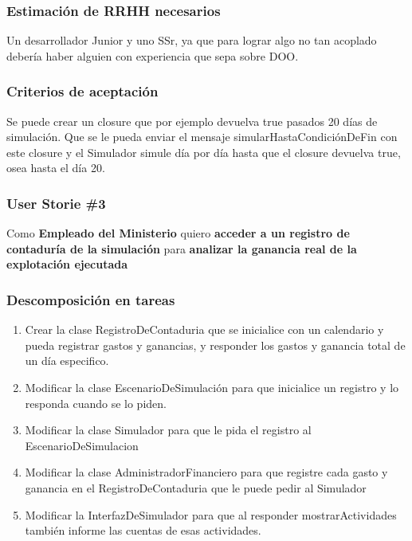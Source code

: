 \documentclass[10pt,a4paper]{article}
\begin{document}
\subsubsection*{Estimación de RRHH necesarios}

Un desarrollador Junior y uno SSr, ya que para lograr algo no tan acoplado debería haber alguien con experiencia que sepa sobre DOO.

\subsubsection*{Criterios de aceptación}

Se puede crear un closure que por ejemplo devuelva true pasados 20 días de simulación. Que se le pueda enviar el mensaje simularHastaCondiciónDeFin con este closure y el Simulador simule día por día hasta que el closure devuelva true, osea hasta el día 20.

\subsubsection{User Storie \#3}
\begin{framed}
  Como \textbf{Empleado del Ministerio} quiero \textbf{acceder a un registro de contaduría de la simulación} para \textbf{analizar la ganancia real de la explotación ejecutada}
\end{framed}

\subsubsection*{Descomposición en tareas}

\begin{enumerate}
  \item Crear la clase RegistroDeContaduria que se inicialice con un calendario y pueda registrar gastos y ganancias, y responder los gastos y ganancia total de un día especifico.
  \item Modificar la clase EscenarioDeSimulación para que inicialice un registro y lo responda cuando se lo piden.
  \item Modificar la clase Simulador para que le pida el registro al EscenarioDeSimulacion
  \item Modificar la clase AdministradorFinanciero para que registre cada gasto y ganancia en el RegistroDeContaduria que le puede pedir al Simulador
  \item Modificar la InterfazDeSimulador para que al responder mostrarActividades también informe las cuentas de esas actividades.
\end{enumerate}
\end{document}
